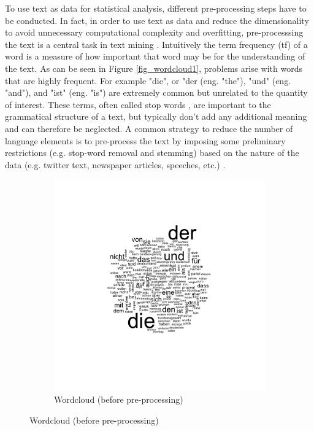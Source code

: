 \documentclass[12pt,a4paper,notitlepage]{article}
\begin{document}
To use text as data for statistical analysis, different pre-processing steps have to be conducted. In fact, in order to use text as data and reduce the dimensionality to avoid unnecessary computational complexity and overfitting, pre-processsing the text is a central task in text mining \citep{bholat_text_2015}. Intuitively the term frequency (tf) of a word is a measure of how important that word may be for the understanding of the text. As can be seen in Figure \ref{fig_wordcloud1}, problems arise with words that are highly frequent. For example "die", or "der (eng. "the"), "und" (eng. "and"), and "ist" (eng. "is") are extremely common but unrelated to the quantity of interest. These terms, often called stop words \citep{gentzkow_text_2017}, are important to the grammatical structure of a text, but typically don't add any additional meaning and can therefore be neglected. A common strategy to reduce the number of language elements is to pre-process the text by imposing some preliminary restrictions (e.g. stop-word removal and stemming) based on the nature of the data (e.g. twitter text, newspaper articles, speeches, etc.) \citep{gentzkow_text_2017}. 

\begin{figure}[H]\label{fig_wordcloud1}
	\begin{center}
		\begin{subfigure}[normla]{0.7\textwidth}
			\includegraphics[width=\textwidth]{../figs/wordcloud.png}
			\caption{Wordcloud (before pre-processing)}
		\end{subfigure}
	\end{center}
\end{figure}
\end{document}
